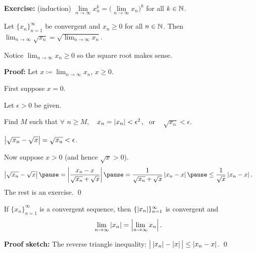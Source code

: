 \documentclass[10pt,aspectratio=169]{beamer}
\begin{document}
\begin{frame}
\textbf{Exercise:} (induction) $\lim\limits_{n\to\infty} x_n^k =
{\bigl(\lim\limits_{n\to\infty} x_n\bigr)}^k$ for all $k \in {\mathbb{N}}$.
\pause

\begin{proposition}
Let $\{ x_n \}_{n=1}^\infty$ be convergent and
$x_n \geq 0$ for all $n \in {\mathbb{N}}$.
Then
$\displaystyle
\lim_{n\to\infty} \sqrt{x_n} =
\sqrt{ \lim_{n\to\infty} x_n }$.
\end{proposition}

\pause
Notice $\displaystyle \lim_{n\to\infty} x_n \geq 0$ so the square root makes sense.

\pause
\textbf{Proof:}
Let $\displaystyle x \coloneqq \lim_{n\to\infty} x_n$,
\pause
\quad   $x \geq 0$.

\pause
\medskip

First suppose $x=0$.

\pause
Let $\epsilon > 0$ be given.

\pause
Find $M$ such that $\forall$ $n \geq M$, ~
$x_n = \left\lvert {x_n} \right\rvert < \epsilon^2$, ~or ~ $\sqrt{x_n} < \epsilon$.

\pause
\thus \quad
$\left\lvert {\sqrt{x_n} - \sqrt{x}} \right\rvert =
\sqrt{x_n} < \epsilon$.

\pause
\medskip

Now suppose $x > 0$ (and hence $\sqrt{x} > 0$).
\pause
\begin{equation*}
\abs{\sqrt{x_n}-\sqrt{x}}
\pause
= 
\abs{\frac{x_n-x}{\sqrt{x_n}+\sqrt{x}}} 
\pause
=
\frac{1}{\sqrt{x_n}+\sqrt{x}}
\abs{x_n-x}
\pause
 \leq
\frac{1}{\sqrt{x}}
\abs{x_n-x} .
\end{equation*}
\pause
The rest is an exercise.
\qed
\end{frame}

\begin{frame}

\begin{proposition}
If $\{ x_n \}_{n=1}^\infty$ is a convergent sequence, then $\{ \left\lvert {x_n} \right\rvert
\}_{n=1}^\infty$
is convergent and
\begin{equation*}
\lim_{n\to\infty} \left\lvert {x_n} \right\rvert = 
\left\lvert {\lim_{n\to\infty} x_n} \right\rvert .
\end{equation*}
\end{proposition}
\pause

\textbf{Proof sketch:}
The reverse triangle inequality: \quad
$\big\lvert \left\lvert {x_n} \right\rvert - \left\lvert {x} \right\rvert \big\rvert \leq \left\lvert {x_n-x} \right\rvert$.
\qed

\end{frame}
\end{document}

